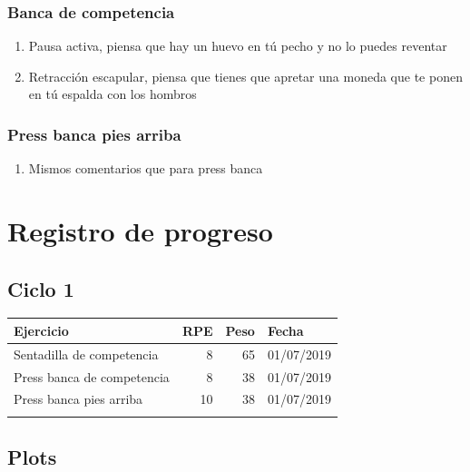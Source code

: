 \documentclass[11pt]{article}
\begin{document}
\subsubsection{Banca de competencia}
\label{sec:org582f0d9}
\begin{enumerate}
\item Pausa activa, piensa que hay un huevo en tú pecho y no lo puedes
reventar
\item Retracción escapular, piensa que tienes que apretar una moneda que
te ponen en tú espalda con los hombros
\end{enumerate}
\subsubsection{Press banca pies arriba}
\label{sec:org4d0bda5}
\begin{enumerate}
\item Mismos comentarios que para press banca
\end{enumerate}
\section{Registro de progreso}
\label{sec:org6cc613b}
\subsection{Ciclo 1}
\label{sec:orgdbb76d5}
\begin{center}
\label{tab:orgd3c6772}
\begin{tabular}{lrrl}
Ejercicio & RPE & Peso & Fecha\\
\hline
Sentadilla de competencia & 8 & 65 & 01/07/2019\\
Press banca de competencia & 8 & 38 & 01/07/2019\\
Press banca pies arriba & 10 & 38 & 01/07/2019\\
 &  &  & \\
\end{tabular}
\end{center}
\subsection{Plots}
\label{sec:orgf67ecf7}
\end{document}
